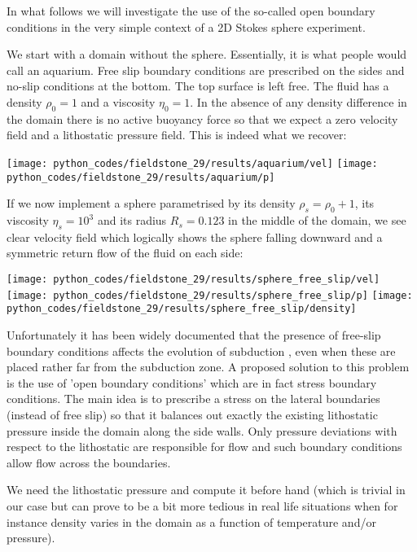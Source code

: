 
\Literature \cite{chgv12}

In what follows we will investigate the use of the so-called open boundary conditions in 
the very simple context of a 2D Stokes sphere experiment. 


We start with a domain without the sphere. Essentially, it is what people would 
call an aquarium.
Free slip boundary conditions are prescribed on the sides and no-slip conditions at the bottom. 
The top surface is left free. The fluid has a density $\rho_0=1$ and a viscosity $\eta_0=1$.
In the absence of any density difference in the domain there is no active buoyancy force
so that we expect a zero velocity field and a lithostatic pressure field. 
This is indeed what we recover:  

\begin{center}
\texttt{[image: python\_codes/fieldstone\_29/results/aquarium/vel]}
\texttt{[image: python\_codes/fieldstone\_29/results/aquarium/p]}
\end{center}

If we now implement a sphere parametrised by its density $\rho_s=\rho_0+1$, its 
viscosity $\eta_s=10^3$ and its radius $R_s=0.123$ in the middle of the domain,  
we see clear velocity field which logically shows the sphere falling downward and 
a symmetric return flow of the fluid on each side:

\begin{center}
\texttt{[image: python\_codes/fieldstone\_29/results/sphere\_free\_slip/vel]}
\texttt{[image: python\_codes/fieldstone\_29/results/sphere\_free\_slip/p]}
\texttt{[image: python\_codes/fieldstone\_29/results/sphere\_free\_slip/density]}
\end{center}

Unfortunately it has been widely documented that the presence of free-slip 
boundary conditions affects the evolution of subduction \cite{chgv12}, 
even when these are placed rather far from the subduction zone. 
A proposed solution to this problem is the use of 'open boundary conditions'
which are in fact stress boundary conditions. 
The main idea is to prescribe a stress on the lateral boundaries (instead of free slip)
so that it balances out exactly the existing lithostatic pressure inside the domain 
along the side walls. Only pressure deviations with respect to the 
lithostatic are responsible for flow and such boundary conditions allow flow  
across the boundaries.

We need the lithostatic pressure and compute it before hand (which is trivial in 
our case but can prove to be a bit more tedious in real life situations when for instance
density varies in the domain as a function of temperature and/or pressure).

